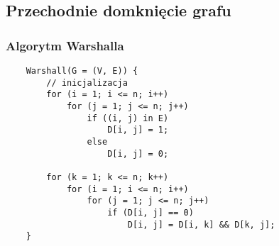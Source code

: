 \documentclass[algorytmy.tex]{subfiles}
\begin{document}

\subsection{Przechodnie domknięcie grafu}
    \subsubsection{Algorytm Warshalla}

    \begin{verbatim}
    Warshall(G = (V, E)) {
        // inicjalizacja
        for (i = 1; i <= n; i++)
            for (j = 1; j <= n; j++)
                if ((i, j) in E)
                    D[i, j] = 1;
                else
                    D[i, j] = 0;

        for (k = 1; k <= n; k++)
            for (i = 1; i <= n; i++)
                for (j = 1; j <= n; j++)
                    if (D[i, j] == 0)
                        D[i, j] = D[i, k] && D[k, j];
    }
    \end{verbatim}

\end{document}
